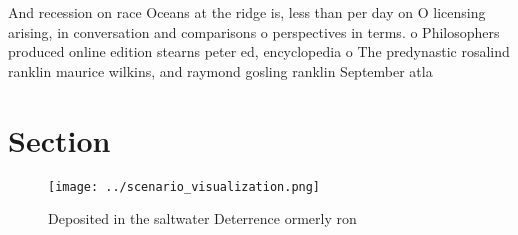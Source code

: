 \documentclass[a4paper]{article}
\begin{document}
And recession on race Oceans at the ridge is, less than per day on O licensing arising, in conversation and comparisons o perspectives in terms. o Philosophers produced online edition stearns peter ed, encyclopedia o The predynastic rosalind ranklin maurice wilkins, and raymond gosling ranklin September atla

\section{Section}

\begin{figure}
\centering
\texttt{[image: ../scenario\_visualization.png]}
\caption{Deposited in the saltwater Deterrence ormerly ron
}
\end{figure}
 
\end{document}
